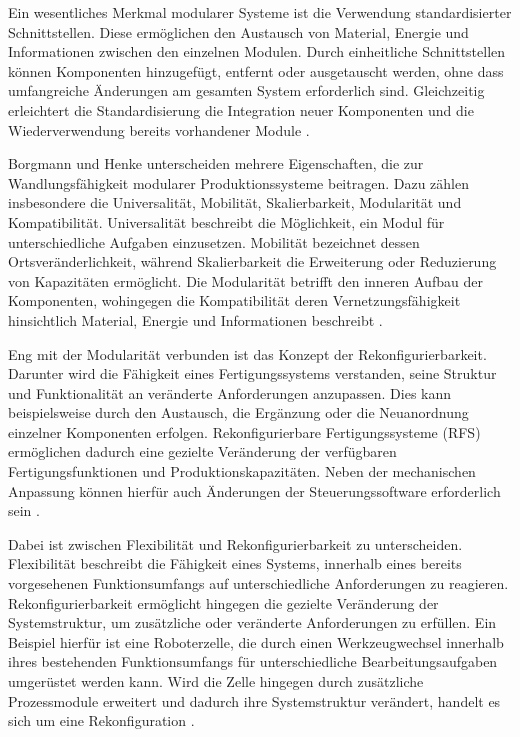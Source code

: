 Ein wesentliches Merkmal modularer Systeme ist die Verwendung standardisierter Schnittstellen. Diese ermöglichen den Austausch von Material, Energie und Informationen zwischen den einzelnen Modulen. Durch einheitliche Schnittstellen können Komponenten hinzugefügt, entfernt oder ausgetauscht werden, ohne dass umfangreiche Änderungen am gesamten System erforderlich sind. Gleichzeitig erleichtert die Standardisierung die Integration neuer Komponenten und die Wiederverwendung bereits vorhandener Module \cite{Borgmann2026}.

Borgmann und Henke unterscheiden mehrere Eigenschaften, die zur Wandlungsfähigkeit modularer Produktionssysteme beitragen. Dazu zählen insbesondere die Universalität, Mobilität, Skalierbarkeit, Modularität und Kompatibilität. Universalität beschreibt die Möglichkeit, ein Modul für unterschiedliche Aufgaben einzusetzen. Mobilität bezeichnet dessen Ortsveränderlichkeit, während Skalierbarkeit die Erweiterung oder Reduzierung von Kapazitäten ermöglicht. Die Modularität betrifft den inneren Aufbau der Komponenten, wohingegen die Kompatibilität deren Vernetzungsfähigkeit hinsichtlich Material, Energie und Informationen beschreibt \cite{Borgmann2026}.

Eng mit der Modularität verbunden ist das Konzept der Rekonfigurierbarkeit. Darunter wird die Fähigkeit eines Fertigungssystems verstanden, seine Struktur und Funktionalität an veränderte Anforderungen anzupassen. Dies kann beispielsweise durch den Austausch, die Ergänzung oder die Neuanordnung einzelner Komponenten erfolgen. Rekonfigurierbare Fertigungssysteme (RFS) ermöglichen dadurch eine gezielte Veränderung der verfügbaren Fertigungsfunktionen und Produktionskapazitäten. Neben der mechanischen Anpassung können hierfür auch Änderungen der Steuerungssoftware erforderlich sein \cite{Trautner2026}.

Dabei ist zwischen Flexibilität und Rekonfigurierbarkeit zu unterscheiden. Flexibilität beschreibt die Fähigkeit eines Systems, innerhalb eines bereits vorgesehenen Funktionsumfangs auf unterschiedliche Anforderungen zu reagieren. Rekonfigurierbarkeit ermöglicht hingegen die gezielte Veränderung der Systemstruktur, um zusätzliche oder veränderte Anforderungen zu erfüllen. Ein Beispiel hierfür ist eine Roboterzelle, die durch einen Werkzeugwechsel innerhalb ihres bestehenden Funktionsumfangs für unterschiedliche Bearbeitungsaufgaben umgerüstet werden kann. Wird die Zelle hingegen durch zusätzliche Prozessmodule erweitert und dadurch ihre Systemstruktur verändert, handelt es sich um eine Rekonfiguration \cite{Trautner2026}.


